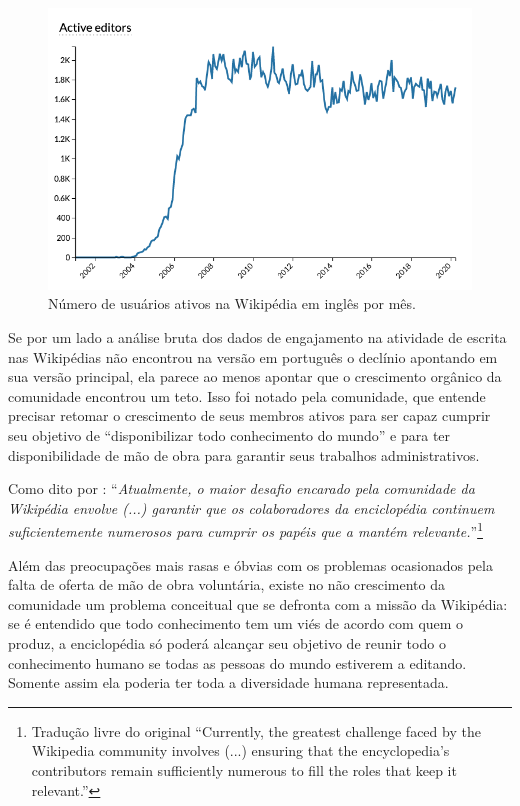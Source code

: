 \begin{figure}[hbt]
    \centering
    \includegraphics[width=1\textwidth]{Images/active_editors_ptwiki.png}
    \caption{Número de usuários ativos na Wikipédia em inglês por mês. \citep{wikimedia_stats_active_editors_ptwiki_2020} }
    \label{fig:active_editors_ptwiki}
\end{figure}

Se por um lado a análise bruta dos dados de engajamento na atividade de escrita nas Wikipédias não encontrou na versão em português o declínio apontando em sua versão principal, ela parece ao menos apontar que o crescimento orgânico da comunidade encontrou um teto. Isso foi notado pela comunidade, que entende precisar retomar o crescimento de seus membros ativos para ser capaz cumprir seu objetivo de ``disponibilizar todo conhecimento do mundo'' e para ter disponibilidade de mão de obra para garantir seus trabalhos administrativos. \citep{morgan_tea_2013}

Como dito por \cite{faulkner_etiquette_2012}: ``\textit{Atualmente, o maior desafio encarado pela comunidade da Wikipédia envolve (...) garantir que os colaboradores da enciclopédia continuem suficientemente numerosos para cumprir os papéis que a mantém relevante.}''\footnote{Tradução livre do original ``Currently, the greatest challenge faced by the Wikipedia community involves (...) ensuring that the encyclopedia’s contributors remain sufficiently numerous to fill the roles that keep it relevant.''}

Além das preocupações mais rasas e óbvias com os problemas ocasionados pela falta de oferta de mão de obra voluntária, existe no não crescimento da comunidade um problema conceitual que se defronta com a missão da Wikipédia: se é entendido que todo conhecimento tem um viés de acordo com quem o produz, a enciclopédia só poderá alcançar seu objetivo de reunir todo o conhecimento humano se todas as pessoas do mundo estiverem a editando. Somente assim ela poderia ter toda a diversidade humana representada.

